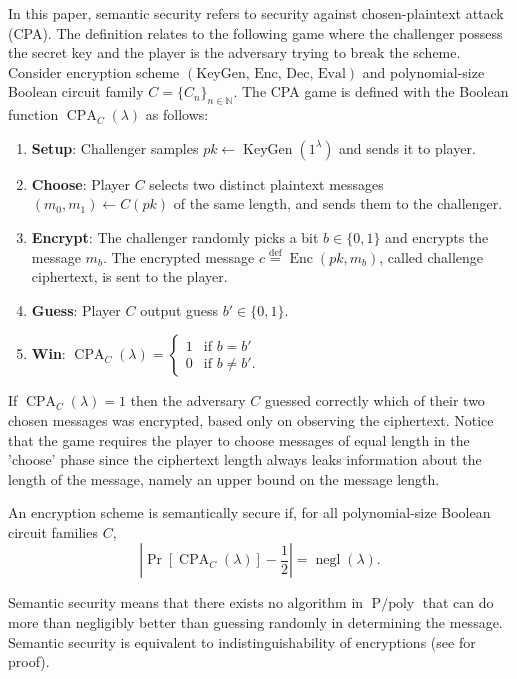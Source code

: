 In this paper, semantic security refers to security against chosen-plaintext attack (CPA). The definition relates to the following game where the challenger possess the secret key and the player is the adversary trying to break the scheme. Consider encryption scheme $(\text{KeyGen, Enc, Dec, Eval})$ and polynomial-size Boolean circuit family $C = \{C_n\}_{n\in \mathbb{N}}$. The CPA game is defined with the Boolean function $\operatorname{CPA}_{C}(\lambda)$ as follows:
\begin{enumerate}
  \item \textbf{Setup}: Challenger samples $pk \leftarrow \operatorname{KeyGen}(1^{\lambda})$ and sends it to player.
  \item \textbf{Choose}: Player $C$ selects two distinct plaintext messages $(m_0, m_1) \leftarrow C(pk)$ of the same length, and sends them to the challenger.
  \item \textbf{Encrypt}: The challenger randomly picks a bit $b \in \{0, 1\}$ and encrypts the message $m_b$. The encrypted message $c \stackrel{\mathrm{def}}{=} \operatorname{Enc}(pk, m_b)$, called challenge ciphertext, is sent to the player.
  \item \textbf{Guess}: Player $C$ output guess $b' \in \{0,1\}$.
  \item \textbf{Win}: $\operatorname{CPA}_{C}(\lambda) = 
  \begin{cases}
  1 & \text{if } b = b'\\
  0 & \text{if } b \neq b'.
  \end{cases}$
\end{enumerate}

If $\operatorname{CPA}_{C}(\lambda) = 1$ then the adversary $C$ guessed correctly which of their two chosen messages was encrypted, based only on observing the ciphertext. Notice that the game requires the player to choose messages of equal length in the 'choose' phase since the ciphertext length always leaks information about the length of the message, namely an upper bound on the message length.
\begin{definition}
    An encryption scheme is semantically secure if, for all polynomial-size Boolean circuit families $C$, $$| \operatorname{Pr}[\operatorname{CPA}_{C}(\lambda)] - \frac{1}{2} | = \operatorname{negl}(\lambda).$$
\end{definition}
Semantic security means that there exists no algorithm in $\operatorname{P/poly}$ that can do more than negligibly better than guessing randomly in determining the message. Semantic security is equivalent to indistinguishability of encryptions (see \cite{Gol04} for proof).

